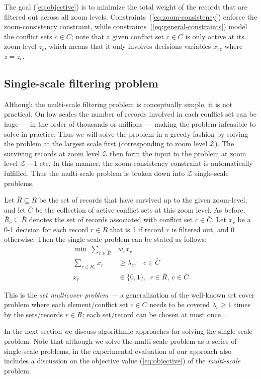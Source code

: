 The goal (\ref{eq:objective}) is to minimize the total weight of the records that are filtered out across all zoom levels. Constraints~(\ref{eq:zoom-consistency}) enforce the zoom-consistency constraint, while constraints~(\ref{eq:general-constraints}) model the conflict sets $c \in C$; note that a given conflict set $c \in C$ is only active at its zoom level $z_c$, which means that it only involves decisions variables $x_{rz}$ where $z = z_c$.

\subsection{Single-scale filtering problem}

Although the multi-scale filtering problem is conceptually simple, it is not practical. On low scales the number of records involved in each conflict set can be huge --- in the order of thousands or millions --- making the problem infeasible to solve in practice. Thus we will solve the problem in a greedy fashion by solving the problem at the largest scale first (corresponding to zoom level $\mathcal{Z}$). The surviving records at zoom level $\mathcal{Z}$ then form the input to the problem at zoom level $\mathcal{Z}-1$ etc. In this manner, the zoom-consistency constraint is automatically fulfilled. Thus the multi-scale problem is broken down into $\mathcal{Z}$ single-scale problems.

Let $\bar{R} \subseteq R$ be the set of records that have survived up to the given zoom-level, and let $\bar{C}$ be the collection of active conflict sets at this zoom level. As before, $\bar{R}_c \subseteq \bar{R}$ denotes the set of records associated with conflict set $c \in \bar{C}$. Let $x_r$ be a 0-1 decision for each record $r \in \bar{R}$ that is 1 if record $r$ is filtered out, and 0 otherwise. Then the single-scale problem can be stated as follows:
\begin{align}
  \label{eq:objective-single}
  \min ~\sum_{r \in \bar{R}} &w_r x_r \\
  \label{eq:general-constraints-single}
  \sum_{r \in \bar{R}_c} x_r &\geq \lambda_c, ~~~~ c \in \bar{C} \\
  x_r & \in \{0, 1\}, ~~ r \in \bar{R}, ~c \in \bar{C}
\end{align}

This is the \emph{set multicover problem} --- a generalization of the well-known set cover problem where each element/conflict set $c \in C$ needs to be covered $\lambda_c \geq 1$ times by the sets/records $r \in R$; each set/record can be chosen at most once~\cite{rajagopalan1998primal}. 

In the next section we discuss algorithmic approaches for solving the single-scale problem. Note that although we solve the multi-scale problem as a series of single-scale problems, in the experimental evaluation of our approach also includes a discussion on the objective value (\ref{eq:objective}) of the \emph{multi-scale} problem. 
